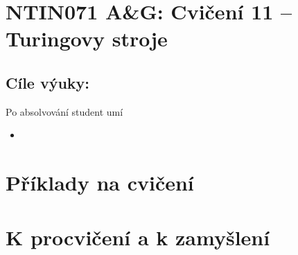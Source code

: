 \documentclass[a4paper,12pt]{amsart}
\begin{document}
\thispagestyle{empty}

\section*{NTIN071 A\&G: Cvičení 11 -- Turingovy stroje}

\medskip

\subsection*{Cíle výuky:} Po absolvování student umí

\begin{itemize}\setlength{\itemsep}{0pt}
    \item 
\end{itemize}

\section*{Příklady na cvičení}

\medskip\begin{problem} 

\end{problem}


\section*{K procvičení a k zamyšlení}


\medskip\begin{problem}

\end{problem}
\end{document}
